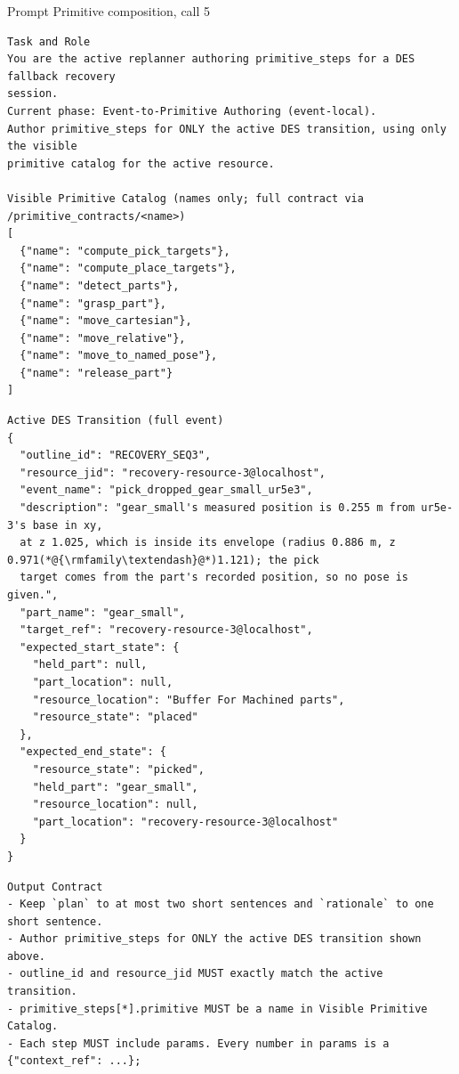\documentclass[preprint,12pt,authoryear]{elsarticle}
\begin{document}
\begin{recordbox}[breakable]{Prompt \enspace Primitive composition, call 5}
\begin{lstlisting}[style=recorded]
Task and Role
You are the active replanner authoring primitive_steps for a DES fallback recovery
session.
Current phase: Event-to-Primitive Authoring (event-local).
Author primitive_steps for ONLY the active DES transition, using only the visible
primitive catalog for the active resource.

Visible Primitive Catalog (names only; full contract via /primitive_contracts/<name>)
[
  {"name": "compute_pick_targets"},
  {"name": "compute_place_targets"},
  {"name": "detect_parts"},
  {"name": "grasp_part"},
  {"name": "move_cartesian"},
  {"name": "move_relative"},
  {"name": "move_to_named_pose"},
  {"name": "release_part"}
]
\end{lstlisting}
\medskip
\begin{lstlisting}[style=recorded]
Active DES Transition (full event)
{
  "outline_id": "RECOVERY_SEQ3",
  "resource_jid": "recovery-resource-3@localhost",
  "event_name": "pick_dropped_gear_small_ur5e3",
  "description": "gear_small's measured position is 0.255 m from ur5e-3's base in xy,
  at z 1.025, which is inside its envelope (radius 0.886 m, z 0.971(*@{\rmfamily\textendash}@*)1.121); the pick
  target comes from the part's recorded position, so no pose is given.",
  "part_name": "gear_small",
  "target_ref": "recovery-resource-3@localhost",
  "expected_start_state": {
    "held_part": null,
    "part_location": null,
    "resource_location": "Buffer For Machined parts",
    "resource_state": "placed"
  },
  "expected_end_state": {
    "resource_state": "picked",
    "held_part": "gear_small",
    "resource_location": null,
    "part_location": "recovery-resource-3@localhost"
  }
}
\end{lstlisting}
\medskip
\begin{lstlisting}[style=recorded]
Output Contract
- Keep `plan` to at most two short sentences and `rationale` to one short sentence.
- Author primitive_steps for ONLY the active DES transition shown above.
- outline_id and resource_jid MUST exactly match the active transition.
- primitive_steps[*].primitive MUST be a name in Visible Primitive Catalog.
- Each step MUST include params. Every number in params is a {"context_ref": ...};

\end{lstlisting}
\end{recordbox}
\end{document}

